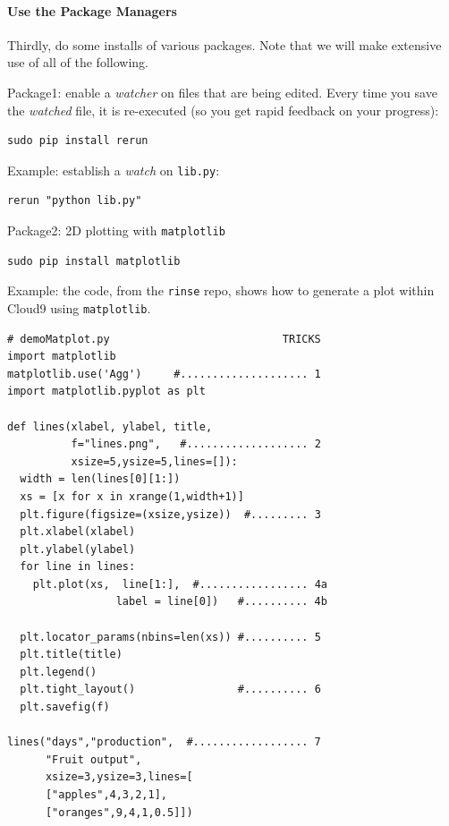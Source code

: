 \paragraph{Use the Package Managers}\label{use-the-package-managers}

Thirdly, do some installs of various packages. Note that we will make
extensive use of all of the following.

Package1: enable a \emph{watcher} on files that are being edited. Every
time you save the \emph{watched} file, it is re-executed (so you get
rapid feedback on your progress):

\begin{lstlisting}
sudo pip install rerun
\end{lstlisting}

Example: establish a \emph{watch} on \texttt{lib.py}:

\begin{lstlisting}
rerun "python lib.py"
\end{lstlisting}

Package2: 2D plotting with \texttt{matplotlib}

\begin{lstlisting}
sudo pip install matplotlib
\end{lstlisting}

Example: the code, from the \texttt{rinse} repo, shows how to generate a
plot within Cloud9 using \texttt{matplotlib}.

\begin{lstlisting}
# demoMatplot.py                           TRICKS
import matplotlib
matplotlib.use('Agg')     #.................... 1
import matplotlib.pyplot as plt 

def lines(xlabel, ylabel, title,
          f="lines.png",   #................... 2
          xsize=5,ysize=5,lines=[]): 
  width = len(lines[0][1:])
  xs = [x for x in xrange(1,width+1)] 
  plt.figure(figsize=(xsize,ysize))  #......... 3
  plt.xlabel(xlabel)
  plt.ylabel(ylabel) 
  for line in lines: 
    plt.plot(xs,  line[1:],  #................. 4a
                 label = line[0])   #.......... 4b
   
  plt.locator_params(nbins=len(xs)) #.......... 5
  plt.title(title)
  plt.legend()
  plt.tight_layout()                #.......... 6
  plt.savefig(f)

lines("days","production",  #.................. 7
      "Fruit output",
      xsize=3,ysize=3,lines=[
      ["apples",4,3,2,1],
      ["oranges",9,4,1,0.5]])
\end{lstlisting}

